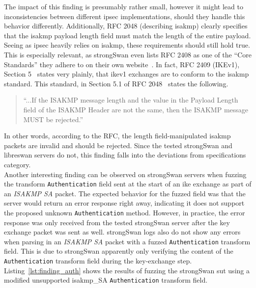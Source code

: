 \newpage
The impact of this finding is presumably rather small, however it might lead to inconsistencies between different \ac{ipsec} implementations, should they handle this behavior differently. Additionally, RFC 2048 (describing \ac{isakmp}) clearly specifies that the \ac{isakmp} payload length field must match the length of the entire payload. Seeing as \ac{ipsec} heavily relies on \ac{isakmp}, these requirements should still hold true. This is especially relevant, as strongSwan even lists RFC 2408 as one of the ``Core Standards'' they adhere to on their own website~\cite{strongswan-ietf}. In fact, RFC 2409 (IKEv1), Section 5~\cite{rfc:ikev1} states very plainly, that \ac{ike}v1 exchanges are to conform to the \ac{isakmp} standard.
This standard, in Section 5.1 of RFC 2048~\cite{rfc:isakmp} states the following. 

\begin{quotation}
	``...If the ISAKMP message length and the value in
	the Payload Length field of the ISAKMP Header are not the same, then
	the ISAKMP message MUST be rejected.''
\end{quotation}

In other words, according to the RFC, the length field-manipulated \ac{isakmp} packets are invalid and should be rejected. Since the tested strongSwan and libreswan servers do not, this finding falls into the deviations from specifications category.  \\

Another interesting finding can be observed on strongSwan servers when fuzzing the transform \texttt{Authentication} field sent at the start of an \ac{ike} exchange as part of an \emph{ISAKMP SA} packet. The expected behavior for the fuzzed field was that the server would return an error response right away, indicating it does not support the proposed unknown \texttt{Authentication} method. However, in practice, the error response was only received from the tested strongSwan server after the key exchange packet was sent as well. strongSwan logs also do not show any errors when parsing in an \emph{ISAKMP SA} packet with a fuzzed \texttt{Authentication} transform field. This is due to strongSwan apparently only verifying the content of the \texttt{Authentication} transform field during the key-exchange step. Listing~\ref{lst:finding_auth} shows the results of fuzzing the strongSwan \ac{sut} using a modified unsupported \ac{isakmp}\_SA \texttt{Authentication} transform field. \\
\vspace{3mm}

